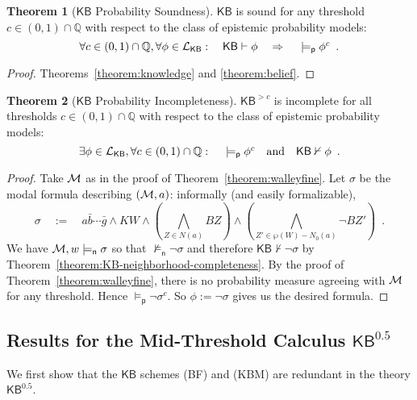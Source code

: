 \documentclass[12pt]{article}
\theoremstyle{definition}
\newtheorem{theorem}{Theorem}[section]
\newcommand{\Rat}{\mathbb{Q}}  %
\newcommand{\M}{{\cal M}}      %
\newcommand{\Lang}{{\cal L}}   %
\newcommand{\KB}{{\mathsf{KB}}}                        %
\newcommand{\KBeq}{{\mathsf{KB}^{\mathsf{0.5}}}}       %
\newcommand{\KBc}{{\mathsf{KB}^{\mathsf{>}c}}}         %
\newcommand{\modelsn}{\models_{\mathsf{n}}}                  %
\newcommand{\modelsp}{\models_{\mathsf{p}}}                  %
\begin{document}
\begin{theorem}[$\KB$ Probability Soundness]
  $\KB$ is sound for any threshold $c\in(0,1)\cap\Rat$ with respect to
  the class of epistemic probability models:
  \[
  \textstyle \forall c\in(0,1)
  \cap\Rat,\forall\phi\in\Lang_\KB:\quad
  \KB\vdash\phi
   \quad\Rightarrow\quad
  {}\modelsp\phi^c \enspace.
  \]
\end{theorem}
\begin{proof}
  Theorems~\ref{theorem:knowledge} and \ref{theorem:belief}.
\end{proof}

\begin{theorem}[$\KB$ Probability Incompleteness]
  \label{theorem:KB-probability-incompleteness}
  $\KBc$ is incomplete for all thresholds $c\in(0,1)\cap\Rat$ with
  respect to the class of epistemic probability models:
  \[
  \textstyle 
  \exists\phi\in\Lang_\KB,
  \forall c\in(0,1)
  \cap\Rat:\quad
  {}\modelsp\phi^c
  \quad\text{and}\quad
  \KB\nvdash\phi\enspace.
  \]
\end{theorem}
\begin{proof}
  Take $\M$ as in the proof of Theorem~\ref{theorem:walleyfine}.  Let
  $\sigma$ be the modal formula describing $(\M,a)$: informally (and
  easily formalizable),
  \[
  \textstyle \sigma \quad:=\quad a\bar{b}\cdots\bar{g}\land
  KW\land(\bigwedge_{Z\in N(a)} BZ)\land
  (\bigwedge_{Z'\in\wp(W)-N_0(a)}\lnot BZ')\enspace.
  \]
  We have $\M,w\modelsn\sigma$ so that $\not\modelsn\lnot\sigma$ and
  therefore $\KB\nvdash\lnot\sigma$ by
  Theorem~\ref{theorem:KB-neighborhood-completeness}.  By the proof of
  Theorem~\ref{theorem:walleyfine}, there is no probability measure
  agreeing with $\M$ for any threshold.  Hence
  $\modelsp\lnot\sigma^c$. So $\phi:=\lnot\sigma$ gives us the desired
  formula.
\end{proof}

\subsection{Results for the Mid-Threshold Calculus \texorpdfstring{$\KBeq$}{KB.5}}
\label{section:kbeq}

We first show that the $\KB$ schemes (BF) and (KBM) are redundant in
the theory $\KBeq$.
\end{document}
